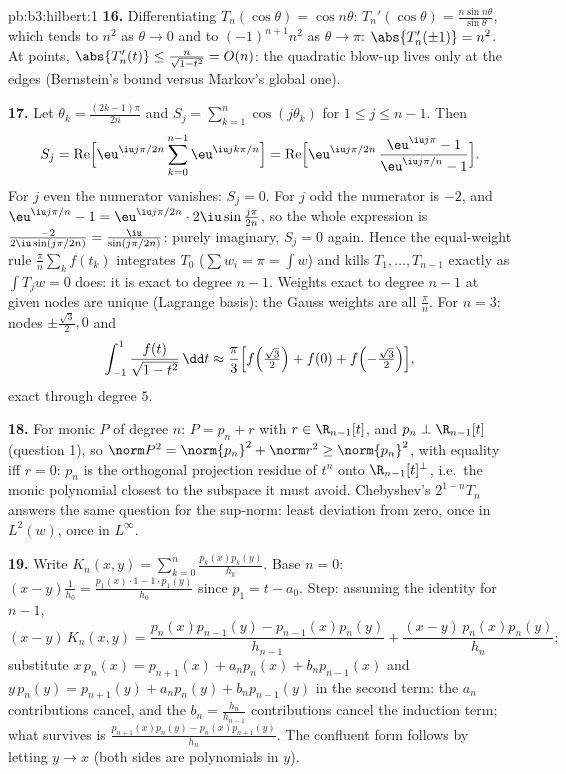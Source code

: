\begin{solution}{pb:b3:hilbert:1}
\textbf{16.} Differentiating $T_n(\cos\theta) = \cos
n\theta$: $T_n'(\cos\theta) = \frac{n\sin n\theta}
{\sin\theta}$, which tends to $n^2$ as $\theta \to 0$ and to
$(-1)^{n+1}n^2$ as $\theta \to \pi$: $\abs{T_n'(\pm1)} =
n^2$. At  points, $\abs{T_n'(t)} \leq
\frac{n}{\sqrt{1 - t^2}} = O(n)$: the quadratic blow-up
lives only at the edges (Bernstein's  bound versus
Markov's global one).

\textbf{17.} Let $\theta_k = \frac{(2k-1)\pi}{2n}$ and $S_j
= \sum_{k=1}^n\cos(j\theta_k)$ for $1 \leq j \leq n-1$. Then
\[
S_j = \operatorname{Re}\Bigl[\eu^{\iu j\pi/2n}
\sum_{k=0}^{n-1}\eu^{\iu jk\pi/n}\Bigr]
= \operatorname{Re}\Bigl[\eu^{\iu j\pi/2n}\,
\frac{\eu^{\iu j\pi} - 1}{\eu^{\iu j\pi/n} - 1}\Bigr] .
\]
For $j$ even the numerator vanishes: $S_j = 0$. For $j$ odd
the numerator is $-2$, and $\eu^{\iu j\pi/n} - 1 =
\eu^{\iu j\pi/2n}\cdot2\iu\sin\frac{j\pi}{2n}$, so the whole
expression is $\frac{-2}{2\iu\sin(j\pi/2n)} =
\frac{\iu}{\sin(j\pi/2n)}$: purely imaginary, $S_j = 0$
again. Hence the equal-weight rule $\frac\pi n\sum_kf(t_k)$
integrates $T_0$ ($\sum w_i = \pi = \int w$) and kills $T_1,
\dots, T_{n-1}$ exactly as $\int T_jw = 0$ does: it is exact
to degree $n - 1$. Weights exact to degree $n-1$ at given
nodes are unique (Lagrange basis): the Gauss weights are all
$\frac\pi n$. For $n = 3$: nodes $\pm\frac{\sqrt3}2, 0$ and
\[
\int_{-1}^1\frac{f(t)}{\sqrt{1 - t^2}}\,\dd t \approx
\frac\pi3\Bigl[f\Bigl(\tfrac{\sqrt3}2\Bigr) + f(0) +
f\Bigl(-\tfrac{\sqrt3}2\Bigr)\Bigr],
\]
exact through degree $5$.

\textbf{18.} For monic $P$ of degree $n$: $P = p_n + r$
with $r \in \R_{n-1}[t]$, and $p_n \perp \R_{n-1}[t]$
(question 1), so $\norm P^2 = \norm{p_n}^2 + \norm r^2 \geq
\norm{p_n}^2$, with equality iff $r = 0$: $p_n$ is the
orthogonal projection residue of $t^n$ onto
$\R_{n-1}[t]^\perp$, i.e.\ the monic polynomial closest to
the subspace it must avoid. Chebyshev's $2^{1-n}T_n$ answers
the same question for the sup-norm: least deviation from
zero, once in $L^2(w)$, once in $L^\infty$.

\textbf{19.} Write $K_n(x, y) =
\sum_{k=0}^n\frac{p_k(x)p_k(y)}{h_k}$. Base $n = 0$: $(x -
y)\frac1{h_0} = \frac{p_1(x)\cdot1 - 1\cdot p_1(y)}{h_0}$
since $p_1 = t - a_0$. Step: assuming the identity for $n -
1$,
\[
(x - y)\,K_n(x,y) = \frac{p_n(x)p_{n-1}(y) -
p_{n-1}(x)p_n(y)}{h_{n-1}} +
\frac{(x - y)\,p_n(x)p_n(y)}{h_n} ;
\]
substitute $x\,p_n(x) = p_{n+1}(x) + a_np_n(x) +
b_np_{n-1}(x)$ and $y\,p_n(y) = p_{n+1}(y) + a_np_n(y) +
b_np_{n-1}(y)$ in the second term: the $a_n$ contributions
cancel, and the $b_n = \frac{h_n}{h_{n-1}}$ contributions
cancel the induction term; what survives is
$\frac{p_{n+1}(x)p_n(y) - p_n(x)p_{n+1}(y)}{h_n}$. The
confluent form follows by letting $y \to x$ (both sides are
polynomials in $y$).


\end{solution}
